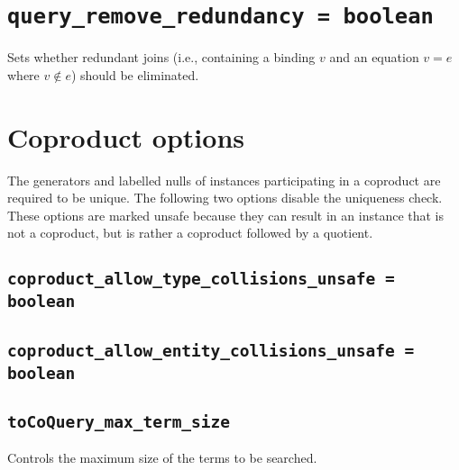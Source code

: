 \documentclass[10pt]{book}
\begin{document}
\section{{\tt query\_remove\_redundancy = boolean}}

Sets whether redundant joins (i.e., containing a binding $v$ and an equation $v = e$ where $v \notin e$) should be eliminated.
\section{Coproduct options}

The generators and labelled nulls of instances participating in a coproduct are required to be unique.  The following two options disable the uniqueness check.  These options are marked unsafe because they can result in an instance that is not a coproduct, but is rather a coproduct followed by a quotient.

\subsection{{\tt coproduct\_allow\_type\_collisions\_unsafe = boolean}}

\subsection{{\tt coproduct\_allow\_entity\_collisions\_unsafe = boolean}}

\subsection{{\tt toCoQuery\_max\_term\_size}}

Controls the maximum size of the terms to be searched. 
\end{document}
